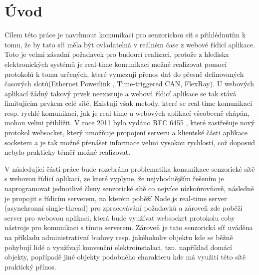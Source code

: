 \chapter{Úvod}
Cílem této práce je navrhnout komunikaci pro senzorickou síť s přihlédnutím k tomu, že by tato síť měla být ovladatelná v reálném čase z webové řídicí aplikace. Toto je velmi zásadní požadavek pro budoucí realizaci, protože z hlediska elektronických systémů je real-time  komunikaci možné realizovat pomocí protokolů k tomu určených, které vymezují přenos dat do přesně definovaných časových slotů(Ethernet Powerlink , Time-triggered CAN, FlexRay).  U webových aplikací žádný takový prvek neexistuje a webová řídicí aplikace se tak stává limitujícím prvkem celé sítě. Existují však metody, které se real-time komunikaci resp. rychlé komunikaci, jak je real-time u webových aplikací všeobecně chápán, mohou velmi přiblížit. V roce 2011 bylo vydáno RFC 6455 \cite{rfc6455}, které zastřešuje nový protokol  websocket, který umožňuje propojení serveru a klientské části aplikace socketem a je tak možné přenášet informace velmi vysokou rychlostí, což doposud nebylo prakticky téměř možné realizovat.

V následující části práce bude rozebrána problematika komunikace senzorické sítě s webovou řídicí aplikací, ze které vyplyne, že nejvhodnějším řešením je naprogramovat jednotlivé členy senzorické sítě co nejvíce ní\-zko\-ú\-rov\-ňo\-vě, následně je propojit s řídicím serverem, na kterém poběží  Node.js real-time server (asynchronní single-thread) pro zpracovávání požadavků a zároveň zde poběží server pro webovou aplikaci, která bude využívat websocket protokolu coby nástroje pro komunikaci s tímto serverem. Zároveň je tato senzorická síť uváděna na příkladu administrativní budovy resp. jakéhokoliv objektu kde se běžně pohybují lidé a využívají konvenční elektroinstalaci, tzn. například domácí objekty, popřípadě jiné objekty podobného charakteru kde má využití této sítě praktický přínos.